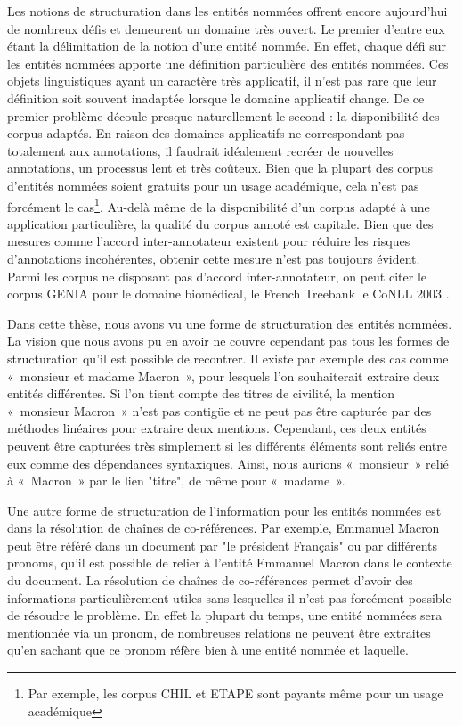 \documentclass[PhD-Yoann-Dupont.tex]{subfiles}
\begin{document}
Les notions de structuration dans les entités nommées offrent encore aujourd'hui de nombreux défis et demeurent un domaine très ouvert. Le premier d'entre eux étant la délimitation de la notion d'une entité nommée. En effet, chaque défi sur les entités nommées apporte une définition particulière des entités nommées. Ces objets linguistiques ayant un caractère très applicatif, il n'est pas rare que leur définition soit souvent inadaptée lorsque le domaine applicatif change. De ce premier problème découle presque naturellement le second : la disponibilité des corpus adaptés. En raison des domaines applicatifs ne correspondant pas totalement aux annotations, il faudrait idéalement recréer de nouvelles annotations, un processus lent et très coûteux. Bien que la plupart des corpus d'entités nommées soient gratuits pour un usage académique, cela n'est pas forcément le cas\footnote{Par exemple, les corpus CHIL \citep{mostefa2007chil} et ETAPE \citep{gravier2012etape} sont payants même pour un usage académique}. Au-delà même de la disponibilité d'un corpus adapté à une application particulière, la qualité du corpus annoté est capitale. Bien que des mesures comme l'accord inter-annotateur existent pour réduire les risques d'annotations incohérentes, obtenir cette mesure n'est pas toujours évident. Parmi les corpus ne disposant pas d'accord inter-annotateur, on peut citer le corpus GENIA \citep{kim2003genia} pour le domaine biomédical, le French Treebank \citep{sagot2012annotation} le CoNLL 2003 \citep{tjong2003introduction}.

Dans cette thèse, nous avons vu une forme de structuration des entités nommées. La vision que nous avons pu en avoir ne couvre cependant pas tous les formes de structuration qu'il est possible de recontrer. Il existe par exemple des cas comme «\ monsieur et madame Macron\ », pour lesquels l'on souhaiterait extraire deux entités différentes. Si l'on tient compte des titres de civilité, la mention «\ monsieur Macron\ » n'est pas contigüe et ne peut pas être capturée par des méthodes linéaires pour extraire deux mentions. Cependant, ces deux entités peuvent être capturées très simplement si les différents éléments sont reliés entre eux comme des dépendances syntaxiques. Ainsi, nous aurions «\ monsieur\ » relié à «\ Macron\ » par le lien "titre", de même pour «\ madame\ ».

Une autre forme de structuration de l'information pour les entités nommées est dans la résolution de chaînes de co-références. Par exemple, Emmanuel Macron peut être référé dans un document par "le président Français" ou par différents pronoms, qu'il est possible de relier à l'entité Emmanuel Macron dans le contexte du document. La résolution de chaînes de co-références permet d'avoir des informations particulièrement utiles sans lesquelles il n'est pas forcément possible de résoudre le problème. En effet la plupart du temps, une entité nommées sera mentionnée via un pronom, de nombreuses relations ne peuvent être extraites qu'en sachant que ce pronom réfère bien à une entité nommée et laquelle.
\end{document}
